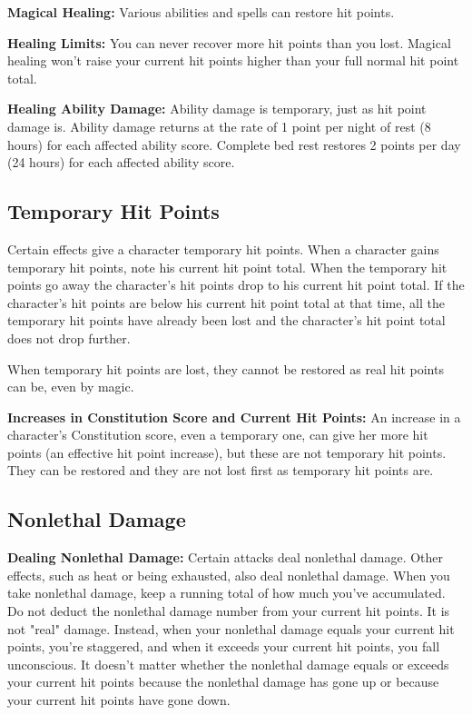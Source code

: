 \textbf{Magical Healing:} Various abilities and spells can restore hit points.

\textbf{Healing Limits:} You can never recover more hit points than you lost. Magical healing won't raise your current hit points higher than your full normal hit point total.

\textbf{Healing Ability Damage:} Ability damage is temporary, just as hit point damage is. Ability damage returns at the rate of 1 point per night of rest (8 hours) for each affected ability score. Complete bed rest restores 2 points per day (24 hours) for each affected ability score.

\subsection{Temporary Hit Points}
Certain effects give a character temporary hit points. When a character gains temporary hit points, note his current hit point total. When the temporary hit points go away the character's hit points drop to his current hit point total. If the character's hit points are below his current hit point total at that time, all the temporary hit points have already been lost and the character's hit point total does not drop further.

When temporary hit points are lost, they cannot be restored as real hit points can be, even by magic.

\textbf{Increases in Constitution Score and Current Hit Points:} An increase in a character's Constitution score, even a temporary one, can give her more hit points (an effective hit point increase), but these are not temporary hit points. They can be restored and they are not lost first as temporary hit points are.

\subsection{Nonlethal Damage}
\textbf{Dealing Nonlethal Damage:} Certain attacks deal nonlethal damage. Other effects, such as heat or being exhausted, also deal nonlethal damage. When you take nonlethal damage, keep a running total of how much you've accumulated. Do not deduct the nonlethal damage number from your current hit points. It is not "real" damage. Instead, when your nonlethal damage equals your current hit points, you're staggered, and when it exceeds your current hit points, you fall unconscious. It doesn't matter whether the nonlethal damage equals or exceeds your current hit points because the nonlethal damage has gone up or because your current hit points have gone down.

